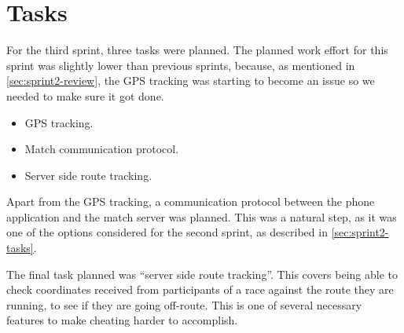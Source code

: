 \section{Tasks}
\label{sec:sprint3-tasks}

For the third sprint, three tasks were planned. The planned work effort for this sprint was slightly lower than previous sprints, because, as mentioned in \autoref{sec:sprint2-review}, the \ac{GPS} tracking was starting to become an issue so we needed to make sure it got done.

\begin{itemize}
	\item{\ac{GPS} tracking.}
	\item{Match communication protocol.}
	\item{Server side route tracking.}
\end{itemize}

Apart from the \ac{GPS} tracking, a communication protocol between the phone application and the match server was planned. This was a natural step, as it was one of the options considered for the second sprint, as described in \autoref{sec:sprint2-tasks}.

The final task planned was ``server side route tracking''. This covers being able to check coordinates received from participants of a race against the route they are running, to see if they are going off-route. This is one of several necessary features to make cheating harder to accomplish.
